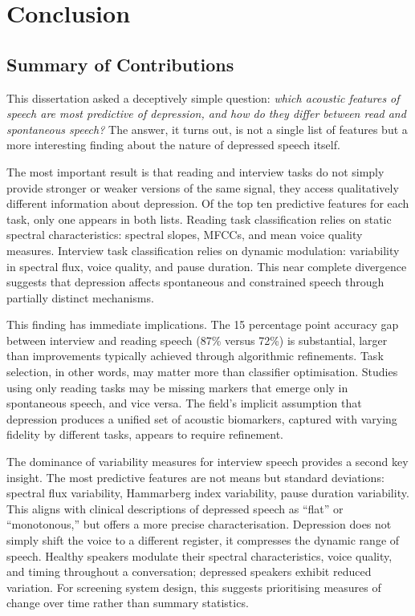 \chapter{Conclusion}

\section{Summary of Contributions}

This dissertation asked a deceptively simple question: \textit{which acoustic features of speech are most predictive of depression, and how do they differ between read and spontaneous speech?} The answer, it turns out, is not a single list of features but a more interesting finding about the nature of depressed speech itself.

The most important result is that reading and interview tasks do not simply provide stronger or weaker versions of the same signal, they access qualitatively different information about depression. Of the top ten predictive features for each task, only one appears in both lists. Reading task classification relies on static spectral characteristics: spectral slopes, MFCCs, and mean voice quality measures. Interview task classification relies on dynamic modulation: variability in spectral flux, voice quality, and pause duration. This near complete divergence suggests that depression affects spontaneous and constrained speech through partially distinct mechanisms.

This finding has immediate implications. The 15 percentage point accuracy gap between interview and reading speech (87\% versus 72\%) is substantial, larger than improvements typically achieved through algorithmic refinements. Task selection, in other words, may matter more than classifier optimisation. Studies using only reading tasks may be missing markers that emerge only in spontaneous speech, and vice versa. The field's implicit assumption that depression produces a unified set of acoustic biomarkers, captured with varying fidelity by different tasks, appears to require refinement.

The dominance of variability measures for interview speech provides a second key insight. The most predictive features are not means but standard deviations: spectral flux variability, Hammarberg index variability, pause duration variability. This aligns with clinical descriptions of depressed speech as ``flat'' or ``monotonous,'' but offers a more precise characterisation. Depression does not simply shift the voice to a different register, it compresses the dynamic range of speech. Healthy speakers modulate their spectral characteristics, voice quality, and timing throughout a conversation; depressed speakers exhibit reduced variation. For screening system design, this suggests prioritising measures of change over time rather than summary statistics.

